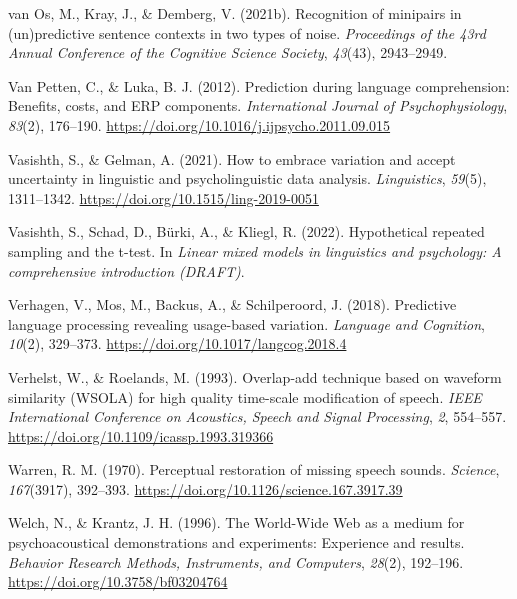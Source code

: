 \documentclass[a4paper, nobind]{templates/ociamthesis}
\newlength{\cslhangindent}
\newenvironment{CSLReferences}[2] %
 {%
  \setlength{\parindent}{0pt}
  \ifodd #1
  \let\oldpar\par
  \def\par{\hangindent=\cslhangindent\oldpar}
  \fi
  \setlength{\parskip}{1mm}
  \setlength{\baselineskip}{6mm}
 }%
 {}
\begin{document}
\begin{CSLReferences}{1}{0}
\leavevmode{}%
van Os, M., Kray, J., \& Demberg, V. (2021b). {Recognition of minipairs in (un)predictive sentence contexts in two types of noise}. \emph{Proceedings of the 43rd Annual Conference of the Cognitive Science Society}, \emph{43}(43), 2943--2949.

\leavevmode{}%
Van Petten, C., \& Luka, B. J. (2012). {Prediction during language comprehension: Benefits, costs, and ERP components}. \emph{International Journal of Psychophysiology}, \emph{83}(2), 176--190. \url{https://doi.org/10.1016/j.ijpsycho.2011.09.015}

\leavevmode{}%
Vasishth, S., \& Gelman, A. (2021). {How to embrace variation and accept uncertainty in linguistic and psycholinguistic data analysis}. \emph{Linguistics}, \emph{59}(5), 1311--1342. \url{https://doi.org/10.1515/ling-2019-0051}

\leavevmode{}%
Vasishth, S., Schad, D., Bürki, A., \& Kliegl, R. (2022). Hypothetical repeated sampling and the t-test. In \emph{Linear mixed models in linguistics and psychology: A comprehensive introduction (DRAFT)}.

\leavevmode{}%
Verhagen, V., Mos, M., Backus, A., \& Schilperoord, J. (2018). Predictive language processing revealing usage-based variation. \emph{Language and Cognition}, \emph{10}(2), 329--373. \url{https://doi.org/10.1017/langcog.2018.4}

\leavevmode{}%
Verhelst, W., \& Roelands, M. (1993). {Overlap-add technique based on waveform similarity (WSOLA) for high quality time-scale modification of speech}. \emph{IEEE International Conference on Acoustics, Speech and Signal Processing}, \emph{2}, 554--557. \url{https://doi.org/10.1109/icassp.1993.319366}

\leavevmode{}%
Warren, R. M. (1970). Perceptual restoration of missing speech sounds. \emph{Science}, \emph{167}(3917), 392--393. \url{https://doi.org/10.1126/science.167.3917.39}

\leavevmode{}%
Welch, N., \& Krantz, J. H. (1996). {The World-Wide Web as a medium for psychoacoustical demonstrations and experiments: Experience and results}. \emph{Behavior Research Methods, Instruments, and Computers}, \emph{28}(2), 192--196. \url{https://doi.org/10.3758/bf03204764}


\end{CSLReferences}
\end{document}
